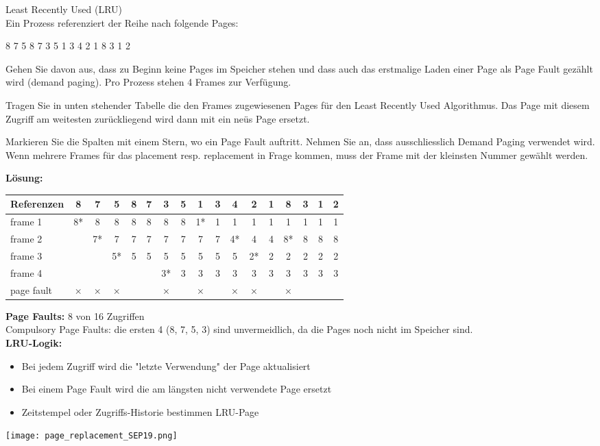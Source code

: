 \begin{example2}{Least Recently Used (LRU)}\\
    Ein Prozess referenziert der Reihe nach folgende Pages:
    \begin{center}
    8 7 5 8 7 3 5 1 3 4 2 1 8 3 1 2
    \end{center}
    
    Gehen Sie davon aus, dass zu Beginn keine Pages im Speicher stehen und dass auch das erstmalige Laden einer Page als Page Fault gezählt wird (demand paging). Pro Prozess stehen 4 Frames zur Verfügung.
    
    Tragen Sie in unten stehender Tabelle die den Frames zugewiesenen Pages für den Least Recently Used Algorithmus. Das Page mit diesem Zugriff am weitesten zurückliegend wird dann mit ein neüs Page ersetzt.
    
    Markieren Sie die Spalten mit einem Stern, wo ein Page Fault auftritt. Nehmen Sie an, dass ausschliesslich Demand Paging verwendet wird. Wenn mehrere Frames für das placement resp. replacement in Frage kommen, muss der Frame mit der kleinsten Nummer gewählt werden.
    
    \tcblower
    
    \textbf{Lösung:}
    
    \begin{center}
    \begin{tabular}{|l|c|c|c|c|c|c|c|c|c|c|c|c|c|c|c|c|}
    \hline
    Referenzen & 8 & 7 & 5 & 8 & 7 & 3 & 5 & 1 & 3 & 4 & 2 & 1 & 8 & 3 & 1 & 2 \\
    \hline
    frame 1 & 8* & 8 & 8 & 8 & 8 & 8 & 8 & 1* & 1 & 1 & 1 & 1 & 1 & 1 & 1 & 1 \\
    \hline
    frame 2 & & 7* & 7 & 7 & 7 & 7 & 7 & 7 & 7 & 4* & 4 & 4 & 8* & 8 & 8 & 8 \\
    \hline
    frame 3 & & & 5* & 5 & 5 & 5 & 5 & 5 & 5 & 5 & 2* & 2 & 2 & 2 & 2 & 2 \\
    \hline
    frame 4 & & & & & & 3* & 3 & 3 & 3 & 3 & 3 & 3 & 3 & 3 & 3 & 3 \\
    \hline
    page fault & × & × & × & & & × & & × & & × & × & & × & & & \\
    \hline
    \end{tabular}
    \end{center}
    
    \textbf{Page Faults:} 8 von 16 Zugriffen\\
    Compulsory Page Faults: die ersten 4 (8, 7, 5, 3) sind unvermeidlich, da die Pages noch nicht im Speicher sind.\\
    
    \textbf{LRU-Logik:}
    \begin{itemize}
        \item Bei jedem Zugriff wird die "letzte Verwendung" der Page aktualisiert
        \item Bei einem Page Fault wird die am längsten nicht verwendete Page ersetzt
        \item Zeitstempel oder Zugriffs-Historie bestimmen LRU-Page
    \end{itemize}
    \texttt{[image: page\_replacement\_SEP19.png]}
\end{example2}
